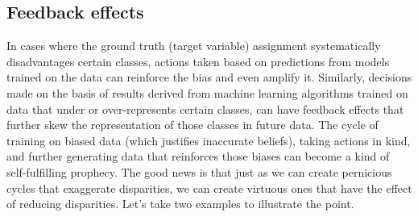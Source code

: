 \subsection{Feedback effects}

In cases where the ground truth (target variable) assignment systematically disadvantages certain classes, actions taken based on predictions from models trained on the data can reinforce the bias and even amplify it. Similarly, decisions made on the basis of results derived from machine learning algorithms trained on data that under or over-represents certain classes, can have feedback effects that further skew the representation of those classes in future data. The cycle of training on biased data (which justifies inaccurate beliefs), taking actions in kind, and further generating data that reinforces those biases can become a kind of self-fulfilling prophecy. The good news is that just as we can create pernicious cycles that exaggerate disparities, we can create virtuous ones that have the effect of reducing disparities. Let's take two examples to illustrate the point.

